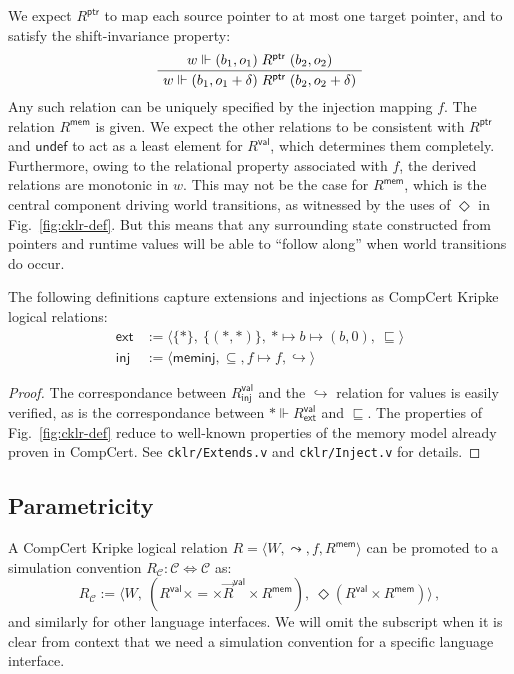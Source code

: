 \documentclass[sigplan,10pt,review,anonymous]{acmart}\settopmatter{printfolios=true,printccs=false,printacmref=false}
\newcommand{\kw}[1]{\ensuremath{ \mathsf{#1} }}
\begin{document}
We expect $R^\kw{ptr}$ to map
each source pointer to at most one target pointer,
and to satisfy the shift-invariance property:
\[
  \AxiomC{$w \Vdash (b_1, o_1) \mathrel{R^\kw{ptr}} (b_2, o_2)$}
  \UnaryInfC{$w \Vdash (b_1, o_1 + \delta) \mathrel{R^\kw{ptr}} (b_2, o_2 + \delta)$}
  \DisplayProof
\]
Any such relation can be uniquely specified by
the injection mapping $f$.
The relation $R^\kw{mem}$ is given.
We expect the other relations to be consistent with $R^\kw{ptr}$
and $\kw{undef}$ to act as a least element for $R^\kw{val}$,
which determines them completely.
Furthermore, owing to the relational property associated with $f$,
the derived relations are monotonic in $w$.
This may not be the case for $R^\kw{mem}$,
which is the central component driving world transitions,
as witnessed by the uses of $\Diamond$ in Fig.~\ref{fig:cklr-def}.
But this means that any surrounding state
constructed from pointers and runtime values
will be able to ``follow along'' when
world transitions do occur.

\begin{theorem}
The following definitions capture extensions and
injections as CompCert Kripke logical relations:
\begin{align*}
  \kw{ext} &:=
    \langle \{*\}, \: \{(*,*)\}, \: * \mapsto b \mapsto (b, 0), \:
    {\sqsubseteq} \rangle
  \\
  \kw{inj} &:=
    \langle \kw{meminj}, {\subseteq}, f \mapsto f, {\hookrightarrow} \rangle
\end{align*}
\begin{proof}
The correspondance between $R^\kw{val}_\kw{inj}$ and
the $\hookrightarrow$ relation for values is easily verified,
as is the correspondance between
$* \Vdash R^\kw{val}_\kw{ext}$ and $\sqsubseteq$.
The properties of Fig.~\ref{fig:cklr-def}
reduce to well-known properties of the memory model
already proven in CompCert.
See \texttt{cklr/Extends.v} and \texttt{cklr/Inject.v}
for details.
\end{proof}
\end{theorem}


\subsection{Parametricity} \label{sec:param} %

A CompCert Kripke logical relation $R = \langle W, {\leadsto}, f, R^\kw{mem} \rangle$
can be promoted to a simulation convention
$R_\mathcal{C} : \mathcal{C} \Leftrightarrow \mathcal{C}$
as:
\[
  R_\mathcal{C} :=
    \langle
      W, \:
      (R^\kw{val} \times {=} \times \vec{R}^\kw{val} \times R^\kw{mem}), \:
      \Diamond (R^\kw{val} \times R^\kw{mem})
    \rangle \,,
\]
and similarly for other language interfaces.
We will omit the subscript when it is clear from context
that we need a simulation convention
for a specific language interface.
\end{document}
